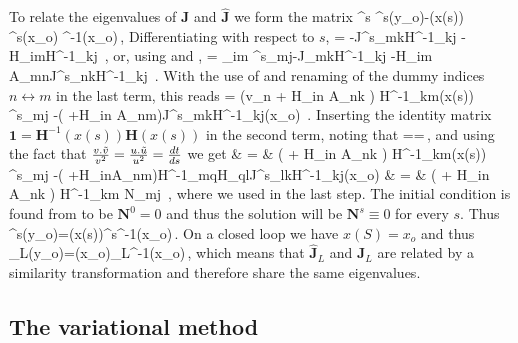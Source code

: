   To relate the eigenvalues of $\mathbf{J}$ and $\mathbf{\hat{J}}$ we form the matrix
  \beq
  	^s \equiv {}^s(y_o)-(x(s)) ^s(x_o) ^{-1}(x_o)\,,
	\label{eq:def:N}
  \eeq
  Differentiating with respect to $s$,
  \beq
  	  =  -J^s_{mk}H^{-1}_{kj}
						-H_{im}H^{-1}_{kj} \,,
  \eeq
  or, using  and ,
  \beq
	  = \hdtds{}_{im} ^s_{mj}-J_{mk}H^{-1}_{kj}
						-H_{im} \dtds A_{mn}J^s_{nk}H^{-1}_{kj} \,.
  \eeq
  With the use of  and renaming of the dummy indices $n\leftrightarrow m$ in the last term, this reads
  \beq	
	 = \hdtds \left(v_n + H_{in} A_{nk} \right)
				H^{-1}_{km}(x(s)) ^s_{mj}
				-\left(
						+\dtds H_{in} A_{nm}\right)J^s_{mk}H^{-1}_{kj}(x_o) \,.
  \eeq
  Inserting the identity matrix $\mathbf{1} = \mathbf{H}^{-1}(x(s))\mathbf{H}(x(s))$ in the second term, noting that
  \beq
  	==\,,
  \eeq
  and using the fact that $\frac{v.\tilde{v}}{v^2}=\frac{u.\tilde{u}}{u^2}={\frac{d t}{d s}}$ we get
  \bea
	 & = &  \left(  +  H_{in} A_{nk} \right)
				H^{-1}_{km}(x(s)) ^s_{mj}
				-\left(
						+H_{in}A_{nm}\right)H^{-1}_{mq}H_{ql}J^s_{lk}H^{-1}_{kj}(x_o) \continue
			& = & \left(  +  H_{in} A_{nk} \right) H^{-1}_{km} N_{mj} \,,
	\label{eq:dNds}
  \eea
  where we used  in the last step.  The initial condition is found from 
  to be $\mathbf{N}^0=0$ and thus the solution will be $\mathbf{N}^s \equiv 0$ for every $s$. Thus
 \beq
 	^s(y_o)=(x(s))^s^{-1}(x_o)\,.
 \eeq
 On a closed loop we have $x(S)=x_o$ and thus
 \beq
 	_L(y_o)=(x_o)_L^{-1}(x_o)\,,
 \eeq
 which means that $\mathbf{\hat{J}}_L$ and $\mathbf{J}_L$ are related by a similarity transformation and therefore
 share the same eigenvalues.





\subsection{The variational method}

